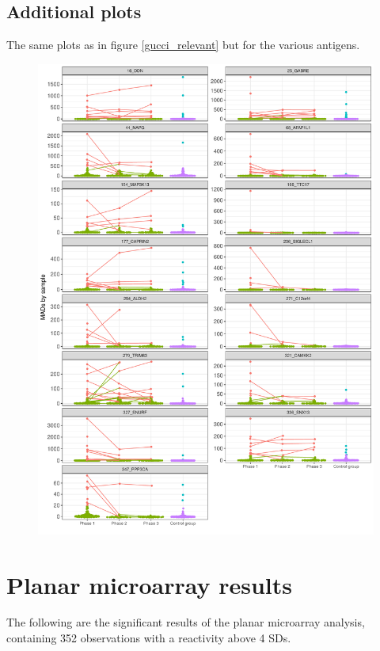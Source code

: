 \documentclass{article}
\begin{document}
\subsection{Additional plots}\label{gucci_various}
The same plots as in figure \ref{gucci_relevant} but for the various antigens.

\newpage
\begin{figure}[H]
	\centering
	\includegraphics[width=0.95\linewidth]{figures/gucci_various+undoc.pdf}
\end{figure}

\newpage
\section{Planar microarray results}\label{42k_results}
The following are the significant results of the planar microarray analysis, containing 352 observations with a reactivity above 4 SDs.
\end{document}

